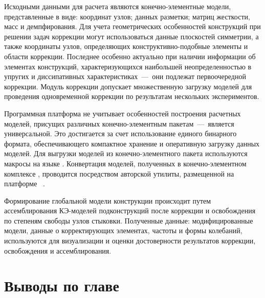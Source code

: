 Исходными данными для расчета являются конечно-элементные модели, представленные в виде: координат узлов; данных разметки; матриц жесткости, масс и демпфирования. Для учета геометрических особенностей конструкций при решении задач коррекции могут использоваться данные плоскостей симметрии, а также координаты узлов, определяющих конструктивно-подобные элементы и области коррекции. Последнее особенно актуально при наличии информации об элементах конструкций, характеризующихся наибольшей неопределенностью в упругих и диссипативных характеристиках~---~они подлежат первоочередной коррекции. Модуль коррекции допускает множественную загрузку моделей для проведения одновременной коррекции по результатам нескольких экспериментов.

Программная платформа не учитывает особенностей построения расчетных моделей, присущих различных конечно-элементным пакетам~---~является универсальной. Это достигается за счет использование единого бинарного формата, обеспечивающего компактное хранение и оперативную загрузку данных моделей. Для выгрузки моделей из конечно-элементного пакета  используются макросы на языке . Конвертация моделей, полученных в конечно-элементном комплексе , проводится посредством авторской утилиты, размещенной на платформе ~\cite{lib:author:github:pchConverter}. 

Формирование глобальной модели конструкции происходит путем ассемблирования КЭ-моделей подконструкций после коррекции и освобождения по степеням свободы узлов стыковки. Полученные данные: модифицированные модели, данные о корректирующих элементах, частоты и формы колебаний, используются для визуализации и оценки достоверности результатов коррекции, освобождения и ассемблирования. 

\section{Выводы по главе \thechapter}

